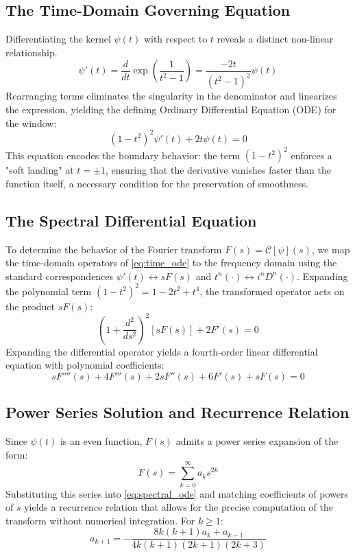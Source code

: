 \documentclass[11pt]{article}
\theoremstyle{breakdef}
\begin{document}
\subsection{The Time-Domain Governing Equation}
Differentiating the kernel $\psi(t)$ with respect to $t$ reveals a distinct non-linear relationship.
\begin{equation}
\psi'(t) = \frac{d}{dt} \exp\left( \frac{1}{t^2-1} \right) = \frac{-2t}{(t^2-1)^2} \psi(t)
\end{equation}
Rearranging terms eliminates the singularity in the denominator and linearizes the expression, yielding the defining Ordinary Differential Equation (ODE) for the window:
\begin{equation}
\label{eq:time_ode}
(1 - t^2)^2 \psi'(t) + 2t \psi(t) = 0
\end{equation}
This equation encodes the boundary behavior: the term $(1-t^2)^2$ enforces a "soft landing" at $t=\pm 1$, ensuring that the derivative vanishes faster than the function itself, a necessary condition for the preservation of smoothness.

\subsection{The Spectral Differential Equation}
To determine the behavior of the Fourier transform $F(s) = \mathcal{C}[\psi](s)$, we map the time-domain operators of \cref{eq:time_ode} to the frequency domain using the standard correspondences $\psi'(t) \leftrightarrow s F(s)$ and $t^n (\cdot) \leftrightarrow i^n D^n (\cdot)$.
Expanding the polynomial term $(1-t^2)^2 = 1 - 2t^2 + t^4$, the transformed operator acts on the product $sF(s)$:
\begin{equation}
\left( 1 + \frac{d^2}{ds^2} \right)^2 [s F(s)] + 2 F'(s) = 0
\end{equation}
Expanding the differential operator yields a fourth-order linear differential equation with polynomial coefficients:
\begin{equation}
\label{eq:spectral_ode}
s F''''(s) + 4 F'''(s) + 2s F''(s) + 6 F'(s) + s F(s) = 0
\end{equation}

\subsection{Power Series Solution and Recurrence Relation}
Since $\psi(t)$ is an even function, $F(s)$ admits a power series expansion of the form:
\begin{equation}
F(s) = \sum_{k=0}^{\infty} a_k s^{2k}
\end{equation}
Substituting this series into \cref{eq:spectral_ode} and matching coefficients of powers of $s$ yields a recurrence relation that allows for the precise computation of the transform without numerical integration.
For $k \ge 1$:
\begin{equation}
a_{k+1} = - \frac{8k(k+1) a_k + a_{k-1}}{4k(k+1)(2k+1)(2k+3)}
\end{equation}
\end{document}
